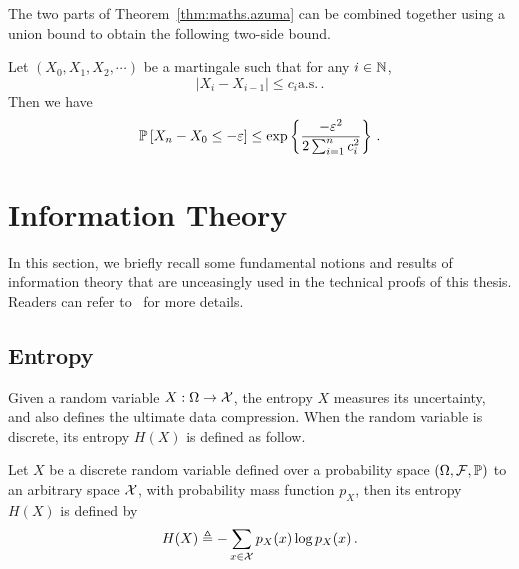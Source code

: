 The two parts of Theorem~\ref{thm:maths.azuma} can be combined together using a union bound to obtain the following two-side bound.

\begin{corollary}\label{cor:maths.azuma}
\begin{leftbar}[corollarybar]
    Let $(X_0, X_1, X_2, \cdots)$ be a martingale such that for any $i\in{\mathbb N}$,
    \[
        |X_i-X_{i-1}|\leq c_i \text{a.s.}\,.
    \]
    Then we have
    \[
        \mathbb{P}\left[X_n-X_0 \leq -\varepsilon\right] \leq \exp\left\{\frac{-\varepsilon^2}{2\sum_{i=1}^n c_i^2}\right\}\,.
    \]
\end{leftbar}
\end{corollary}



\section{Information Theory}\label{app:maths.information}

In this section, we briefly recall some fundamental notions and results of information theory that are unceasingly used in the technical proofs of this thesis. Readers can refer to~\cite{cover2006} for more details.

\subsection{Entropy}\label{app:maths.information.entropy}

Given a random variable $X: \Omega \rightarrow \mathcal{X}$, the \gls{entropy} $X$ measures its uncertainty, and also defines the ultimate data compression. When the random variable is discrete, its entropy $H(X)$ is defined as follow.

\begin{definition}[entropy]\label{def:entropy}
\begin{leftbar}[defnbar]
    Let $X$ be a discrete random variable defined over a probability space $(\Omega,\mathcal{F},\mathbb{P})$ to an arbitrary space $\mathcal{X}$, with probability mass function $p_X$, then its entropy $H(X)$ is defined by
    \[
        H(X) \triangleq - \sum_{x\in\mathcal{X}} p_X(x)\log p_X(x)\,.
    \]
\end{leftbar}
\end{definition}

